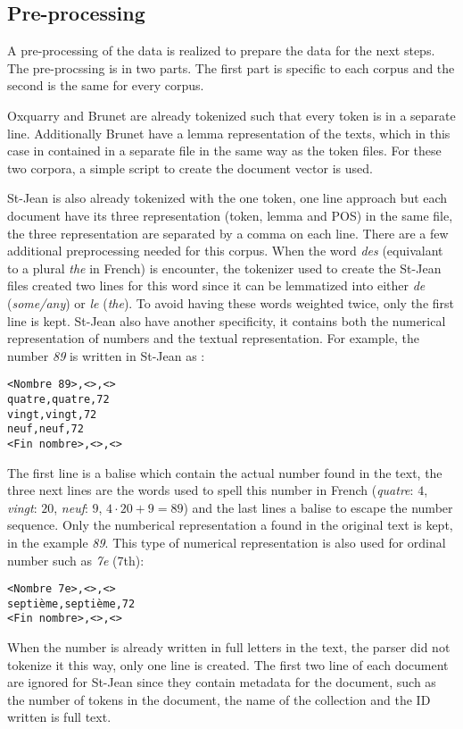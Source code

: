 \subsection{Pre-processing}

A pre-processing of the data is realized to prepare the data for the next steps.
The pre-procssing is in two parts.
The first part is specific to each corpus and the second is the same for every corpus.

Oxquarry and Brunet are already tokenized such that every token is in a separate line.
Additionally Brunet have a lemma representation of the texts, which in this case in contained in a separate file in the same way as the token files.
For these two corpora, a simple script to create the document vector is used.

St-Jean is also already tokenized with the one token, one line approach but each document have its three representation (token, lemma and POS) in the same file, the three representation are separated by a comma on each line.
There are a few additional preprocessing needed for this corpus.
When the word \textit{des} (equivalant to a plural \textit{the} in French) is encounter, the tokenizer used to create the St-Jean files created two lines for this word since it can be lemmatized into either \textit{de} (\textit{some/any}) or \textit{le} (\textit{the}).
To avoid having these words weighted twice, only the first line is kept.
St-Jean also have another specificity, it contains both the numerical representation of numbers and the textual representation.
For example, the number \textit{89} is written in St-Jean as :
\begin{verbatim}
<Nombre 89>,<>,<>
quatre,quatre,72
vingt,vingt,72
neuf,neuf,72
<Fin nombre>,<>,<>
\end{verbatim}
The first line is a balise which contain the actual number found in the text, the three next lines are the words used to spell this number in French (\textit{quatre}: $4$, \textit{vingt}: $20$, \textit{neuf}: $9$, $4 \cdot 20 + 9 = 89$) and the last lines a balise to escape the number sequence.
Only the numberical representation a found in the original text is kept, in the example \textit{89}.
This type of numerical representation is also used for ordinal number such as \textit{7e} (7th):
\begin{verbatim}
<Nombre 7e>,<>,<>
septième,septième,72
<Fin nombre>,<>,<>
\end{verbatim}
When the number is already written in full letters in the text, the parser did not tokenize it this way, only one line is created.
The first two line of each document are ignored for St-Jean since they contain metadata for the document, such as the number of tokens in the document, the name of the collection and the ID written is full text.

